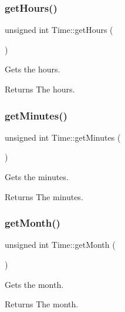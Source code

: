 \subsubsection{\texorpdfstring{get\+Hours()}{getHours()}}
{\footnotesize\ttfamily unsigned int Time\+::get\+Hours (\begin{DoxyParamCaption}{ }\end{DoxyParamCaption})}



Gets the hours. 

\begin{DoxyReturn}{Returns}
The hours. 
\end{DoxyReturn}
\mbox{\label{classTime_a800d91da444cd295a329925c45942359}} 
\subsubsection{\texorpdfstring{get\+Minutes()}{getMinutes()}}
{\footnotesize\ttfamily unsigned int Time\+::get\+Minutes (\begin{DoxyParamCaption}{ }\end{DoxyParamCaption})}



Gets the minutes. 

\begin{DoxyReturn}{Returns}
The minutes. 
\end{DoxyReturn}
\mbox{\label{classTime_a22fd86b14d3b067cf1447fd9ca5caf6f}} 
\subsubsection{\texorpdfstring{get\+Month()}{getMonth()}}
{\footnotesize\ttfamily unsigned int Time\+::get\+Month (\begin{DoxyParamCaption}{ }\end{DoxyParamCaption})}



Gets the month. 

\begin{DoxyReturn}{Returns}
The month. 
\end{DoxyReturn}
\mbox{\label{classTime_ade4d01d38041bb86a2e1ded9fd3cd28e}} 
